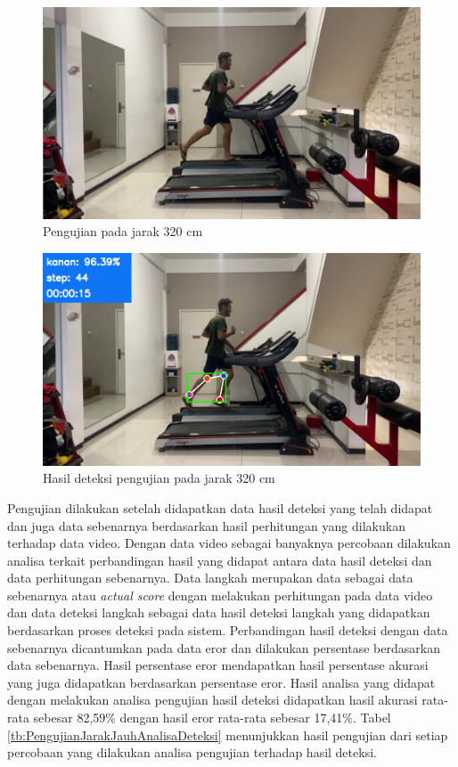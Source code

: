 \begin{figure}[H]
  \centering
  \includegraphics[scale=0.5]{gambar/jarak_jauh.png}
  \caption{Pengujian pada jarak 320 cm}
  \label{fig:PengujianJarakJauh}
\end{figure}

\begin{figure}[H]
  \centering
  \includegraphics[scale=0.5]{gambar/jarak_jauh2.png}
  \caption{Hasil deteksi pengujian pada jarak 320 cm}
  \label{fig:PengujianJarakJauh2}
\end{figure}

Pengujian dilakukan setelah didapatkan data hasil deteksi yang telah didapat dan juga data sebenarnya berdasarkan hasil perhitungan yang dilakukan terhadap data video. Dengan data video sebagai banyaknya percobaan dilakukan analisa terkait perbandingan hasil yang didapat antara data hasil deteksi dan data perhitungan sebenarnya. Data langkah merupakan data sebagai data sebenarnya atau \emph{actual score} dengan melakukan perhitungan pada data video dan data deteksi langkah sebagai data hasil deteksi langkah yang didapatkan berdasarkan proses deteksi pada sistem. Perbandingan hasil deteksi dengan data sebenarnya dicantumkan pada data eror dan dilakukan persentase berdasarkan data sebenarnya. Hasil persentase eror mendapatkan hasil persentase akurasi yang juga didapatkan berdasarkan persentase eror. Hasil analisa yang didapat dengan melakukan analisa pengujian hasil deteksi didapatkan hasil akurasi rata-rata sebesar 82,59\% dengan hasil eror rata-rata sebesar 17,41\%. Tabel \ref{tb:PengujianJarakJauhAnalisaDeteksi} menunjukkan hasil pengujian dari setiap percobaan yang dilakukan analisa pengujian terhadap hasil deteksi.

